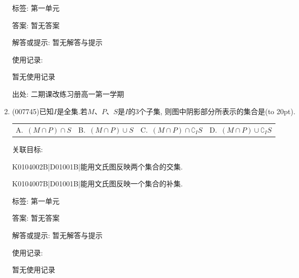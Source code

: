 \documentclass[10pt,a4paper]{article}
\newcommand{\bracket}[1]{(\hbox to #1pt{})}
\newcommand{\fourch}[4]{\par\begin{tabular}{p{.23\textwidth}p{.23\textwidth}p{.23\textwidth}p{.23\textwidth}}
A.~#1 &B.~#2& C.~#3& D.~#4
\end{tabular}}
\begin{document}
\begin{enumerate}[1.]
标签: 第一单元

答案: 暂无答案

解答或提示: 暂无解答与提示

使用记录:

暂无使用记录


出处: 二期课改练习册高一第一学期
\item { (007745)}已知$I$是全集.若$M$、$P$、$S$是$I$的$3$个子集, 则图中阴影部分所表示的集合是\bracket{20}.
\begin{center}
\end{center}
\fourch{$(M\cap P)\cap S$}{$(M\cap P)\cup S$}{$(M\cap P)\cap \complement _IS$}{$(M\cap P)\cup \complement _IS$}


关联目标:

K0104002B|D01001B|能用文氏图反映两个集合的交集.

K0104007B|D01001B|能用文氏图反映一个集合的补集.



标签: 第一单元

答案: 暂无答案

解答或提示: 暂无解答与提示

使用记录:

暂无使用记录



\end{enumerate}
\end{document}

